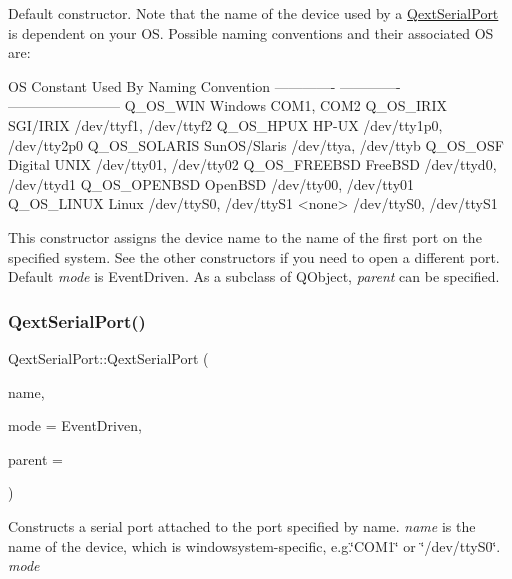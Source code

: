 Default constructor. Note that the name of the device used by a \hyperlink{classQextSerialPort}{Qext\+Serial\+Port} is dependent on your OS. Possible naming conventions and their associated OS are\+:


\begin{DoxyCode}
OS Constant       Used By         Naming Convention
-------------     -------------   ------------------------
Q\_OS\_WIN          Windows         COM1, COM2
Q\_OS\_IRIX         SGI/IRIX        /dev/ttyf1, /dev/ttyf2
Q\_OS\_HPUX         HP-UX           /dev/tty1p0, /dev/tty2p0
Q\_OS\_SOLARIS      SunOS/Slaris    /dev/ttya, /dev/ttyb
Q\_OS\_OSF          Digital UNIX    /dev/tty01, /dev/tty02
Q\_OS\_FREEBSD      FreeBSD         /dev/ttyd0, /dev/ttyd1
Q\_OS\_OPENBSD      OpenBSD         /dev/tty00, /dev/tty01
Q\_OS\_LINUX        Linux           /dev/ttyS0, /dev/ttyS1
<none>                            /dev/ttyS0, /dev/ttyS1
\end{DoxyCode}


This constructor assigns the device name to the name of the first port on the specified system. See the other constructors if you need to open a different port. Default {\itshape mode} is Event\+Driven. As a subclass of Q\+Object, {\itshape parent} can be specified. \mbox{\label{classQextSerialPort_ab8e7dd61c9b064b55d4c609ae1f2afcb}} 
\subsubsection{\texorpdfstring{Qext\+Serial\+Port()}{QextSerialPort()}\hspace{0.1cm}{\footnotesize\ttfamily [2/4]}}
{\footnotesize\ttfamily Qext\+Serial\+Port\+::\+Qext\+Serial\+Port (\begin{DoxyParamCaption}\item[{const Q\+String \&}]{name,  }\item[{\hyperlink{classQextSerialPort_a6002128d7351ea9a958d6a6d1fc6b9bd}{Qext\+Serial\+Port\+::\+Query\+Mode}}]{mode = {\ttfamily EventDriven},  }\item[{Q\+Object $\ast$}]{parent = {} }\end{DoxyParamCaption})\hspace{0.3cm}{\ttfamily [explicit]}}

Constructs a serial port attached to the port specified by name. {\itshape name} is the name of the device, which is windowsystem-\/specific, e.\+g.\char`\"{}\+C\+O\+M1\char`\"{} or \char`\"{}/dev/tty\+S0\char`\"{}. {\itshape mode} \mbox{\label{classQextSerialPort_a7ddaffdbbb507477fd4f4224dcbe21a4}} 
